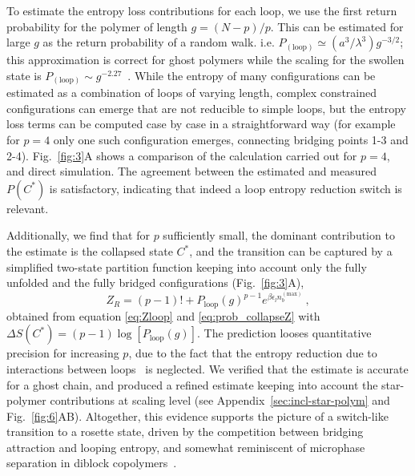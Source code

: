 \documentclass[
preprint,
a4paper,
12pt,
superscriptaddress,
pre]{revtex4}
\begin{document}
To estimate the entropy loss contributions for each loop, we use the
first return probability for the polymer of length $g = (N-p)/p$. This
can be estimated for large $g$ as the return probability of a random
walk. i.e. $P_\mathrm{(loop)} \simeq (a^3/\lambda^3) g^{-3/2}$; this
approximation is correct for ghost polymers while the scaling for the
swollen state is $P_\mathrm{(loop)} \sim
g^{-2.27}$~\cite{Marenduzzo2006c}.
%
While the entropy of many configurations can be estimated as a
combination of loops of varying length, complex constrained
configurations can emerge that are not reducible to simple loops, but
the entropy loss terms can be computed case by case in a
straightforward way (for example for $p=4$ only one such configuration
emerges, connecting bridging points 1-3 and 2-4).  Fig.~\ref{fig:3}A
shows a comparison of the calculation carried out for $p=4$, and
direct simulation.  The agreement between the estimated and
measured $P(C^*)$ is satisfactory, indicating that indeed a loop
entropy reduction switch is relevant. 

%
Additionally, we find that for $p$ sufficiently small, the dominant
contribution to the estimate is the collapsed state $C^*$, and the
transition can be captured by a simplified two-state partition
function keeping into account only the fully unfolded and the fully
bridged configurations (Fig.~\ref{fig:3}A),
%
%
\begin{equation}
  Z_R = (p - 1)! + P_\mathrm{loop}(g)^{p-1}
            e^{\beta \epsilon_l n_b^{\mathrm{(max)}}} \ ,
  \label{eq:Zloop_red}
\end{equation}
%
%
obtained from equation \ref{eq:Zloop} and \ref{eq:prob_collapseZ} with
$\Delta S(C^*) = (p - 1)\log\left[ P_\mathrm{loop}(g)\right]$.
The prediction looses quantitative precision for increasing $p$, due
to the fact that the entropy reduction due to interactions between
loops~\cite{Hsu2004} is neglected. We verified that the estimate is
accurate for a ghost chain, and produced a refined estimate keeping
into account the star-polymer contributions at scaling level (see
Appendix~\ref{sec:incl-star-polym} and
Fig.~\ref{fig:6}AB). Altogether, this evidence supports the picture of
a switch-like transition to a rosette state, driven by the competition
between bridging attraction and looping entropy, and somewhat
reminiscent of microphase separation in diblock
copolymers~\cite{Leibler1980}.
\end{document}
